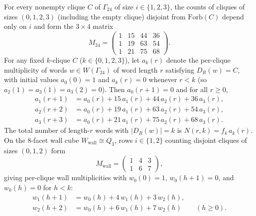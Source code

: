 \begin{theorem}
\label{thm:foata-matrix}
For every nonempty clique $C$ of $\Gamma_{24}$ of size $i \in \{1,2,3\}$, the counts of cliques of sizes $(0,1,2,3)$ (including the empty clique) disjoint from $\mathrm{Forb}(C)$ depend only on $i$ and form the $3 \times 4$ matrix
\begin{equation}
\label{eq:m24-matrix}
M_{24} =
\begin{pmatrix}
1 & 15 & 44 & 36 \\
1 & 19 & 63 & 54 \\
1 & 21 & 75 & 68
\end{pmatrix}.
\end{equation}
For any fixed $k$-clique $C$ ($k \in \{0,1,2,3\}$), let $a_k(r)$ denote the per-clique multiplicity of words $w \in W(\Gamma_{24})$ of word length $r$ satisfying $D_R(w) = C$, with initial values $a_0(0) = 1$ and $a_k(r) = 0$ whenever $r < k$ (so $a_2(1) = a_3(1) = a_3(2) = 0$). Then $a_0(r+1) = 0$ and for all $r \ge 0$,
\begin{align}
a_1(r+1) &= a_0(r) + 15\,a_1(r) + 44\,a_2(r) + 36\,a_3(r), \label{eq:foata-a1}\\
a_2(r+2) &= a_0(r) + 19\,a_1(r) + 63\,a_2(r) + 54\,a_3(r), \label{eq:foata-a2}\\
a_3(r+3) &= a_0(r) + 21\,a_1(r) + 75\,a_2(r) + 68\,a_3(r). \label{eq:foata-a3}
\end{align}
The total number of length-$r$ words with $|D_R(w)| = k$ is $N(r,k) = f_k\,a_k(r)$. On the $8$-facet wall cube $W_{\mathrm{wall}} \cong Q_3$, rows $i \in \{1,2\}$ counting disjoint cliques of sizes $(0,1,2)$ form
\begin{equation}
\label{eq:mwall-matrix}
M_{\mathrm{wall}} =
\begin{pmatrix}
1 & 4 & 3 \\
1 & 6 & 7
\end{pmatrix},
\end{equation}
giving per-clique wall multiplicities with $w_0(0)=1$, $w_0(h+1)=0$, and $w_k(h)=0$ for $h < k$:
\begin{align}
w_1(h+1) &= w_0(h) + 4\,w_1(h) + 3\,w_2(h), \label{eq:wall-w1}\\
w_2(h+2) &= w_0(h) + 6\,w_1(h) + 7\,w_2(h) \qquad (h \ge 0). \label{eq:wall-w2}
\end{align}
\end{theorem}

